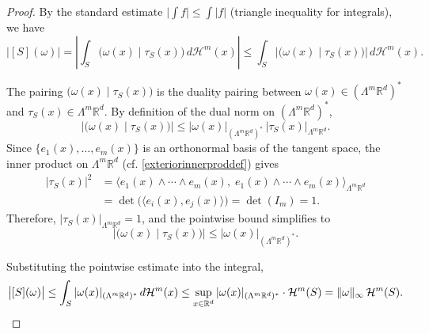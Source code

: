 \documentclass[10pt,a4paper]{amsart}
\begin{document}
\begin{proof}
By the standard estimate $\bigl|\int f\bigr| \leq \int |f|$ (triangle inequality for integrals), we have
\[
\bigl|[S](\omega)\bigr| 
= \left|\int_S \bigl(\omega(x) \mid \tau_S(x)\bigr)\, d\mathcal{H}^m(x)\right|
\leq \int_S \bigl|\bigl(\omega(x) \mid \tau_S(x)\bigr)\bigr|\, d\mathcal{H}^m(x).
\]

The pairing $\bigl(\omega(x) \mid \tau_S(x)\bigr)$ is the duality pairing between $\omega(x) \in (\Lambda^m \mathbb{R}^d)^*$ and $\tau_S(x) \in \Lambda^m \mathbb{R}^d$. By definition of the dual norm on $(\Lambda^m \mathbb{R}^d)^*$,
\[
\bigl|\bigl(\omega(x) \mid \tau_S(x)\bigr)\bigr| 
\leq |\omega(x)|_{(\Lambda^m \mathbb{R}^d)^*}\, |\tau_S(x)|_{\Lambda^m \mathbb{R}^d}.
\]
Since $\{e_1(x), \ldots, e_m(x)\}$ is an orthonormal basis of the tangent space, the inner product on $\Lambda^m \mathbb{R}^d$ (cf. \cref{exteriorinnerproddef}) gives
\begin{align*}
|\tau_S(x)|^2 
&= \langle e_1(x) \wedge \cdots \wedge e_m(x),\; e_1(x) \wedge \cdots \wedge e_m(x) \rangle_{\Lambda^m \mathbb{R}^d}\\
&= \det\!\bigl(\langle e_i(x), e_j(x)\rangle\bigr)
= \det(I_m) = 1.
\end{align*}
Therefore, $|\tau_S(x)|_{\Lambda^m \mathbb{R}^d} = 1$, and the pointwise bound simplifies to
\[
\bigl|\bigl(\omega(x) \mid \tau_S(x)\bigr)\bigr| \leq |\omega(x)|_{(\Lambda^m \mathbb{R}^d)^*}.
\]

Substituting the pointwise estimate into the integral,
\[
\bigl|[S](\omega)\bigr| 
\leq \int_S |\omega(x)|_{(\Lambda^m \mathbb{R}^d)^*}\, d\mathcal{H}^m(x)
\leq \sup_{x \in \mathbb{R}^d} |\omega(x)|_{(\Lambda^m \mathbb{R}^d)^*} \cdot \mathcal{H}^m(S)
= \|\omega\|_\infty\, \mathcal{H}^m(S).\qedhere
\]

\end{proof}
\end{document}
